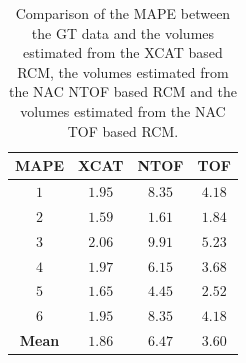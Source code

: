             \begin{table}
                \centering
                
                \captionsetup{singlelinecheck=false, justification=raggedright}
                \caption{Comparison of the \gls{MAPE} between the \gls{GT} data and the volumes estimated from the \gls{XCAT} based \gls{RCM}, the volumes estimated from the \gls{NAC} \gls{NTOF} based \gls{RCM} and the volumes estimated from the \gls{NAC} \gls{TOF} based \gls{RCM}.}
                
                \resizebox*{1.0\linewidth}{!}
                {
                    \begin{tabular}{||c|ccc||}
                        \hline
                        \textbf{\gls{MAPE}} & \textbf{XCAT} & \textbf{\gls{NTOF}} & \textbf{\gls{TOF}} \\
                        \hline
                        \textbf{$1$} & $1.95$ & $8.35$ & $4.18$ \\
                        \textbf{$2$} & $1.59$ & $1.61$ & $1.84$ \\
                        \textbf{$3$} & $2.06$ & $9.91$ & $5.23$ \\
                        \textbf{$4$} & $1.97$ & $6.15$ & $3.68$ \\
                        \textbf{$5$} & $1.65$ & $4.45$ & $2.52$ \\
                        \textbf{$6$} & $1.95$ & $8.35$ & $4.18$ \\
                        \hline
                        \textbf{Mean} & $1.86$ & $6.47$ & $3.60$ \\
                        \hline
                    \end{tabular}
                } \label{tab:impact_of_tof_on_respiratory_motion_modelling_using_nac_pet_results_mape}
            \end{table}
            
